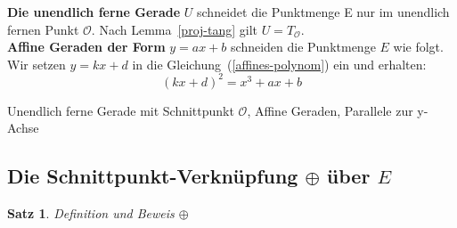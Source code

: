 \documentclass[hidelinks]{article}
\theoremstyle{plain}
\newtheorem{thm}{Satz}[section]
\theoremstyle{definition}
\theoremstyle{rem}
\newcommand{\patinf}{\mathcal{O}}
\begin{document}
\begin{sloppypar}
\textbf{Die unendlich ferne Gerade} $U$ schneidet die Punktmenge E nur im unendlich fernen Punkt $\patinf$. Nach Lemma~\ref{proj-tang} gilt $U=T_{\patinf}$.\\

\textbf{Affine Geraden der Form} $y=ax+b$ schneiden die Punktmenge $E$ wie folgt. Wir setzen $y=kx+d$ in die Gleichung~(\ref{affines-polynom}) ein und erhalten:
\begin{equation*}
	(kx+d)^2=x^3+ax+b
\end{equation*}

Unendlich ferne Gerade mit Schnittpunkt $\patinf$, Affine Geraden, Parallele zur y-Achse
\subsection{Die Schnittpunkt-Verknüpfung $\oplus $ über $E$}\label{schnittpunkt-verkn}
\begin{thm} \label{oplus-op}
    Definition und Beweis $\oplus$
\end{thm}

\end{sloppypar}
\end{document}
